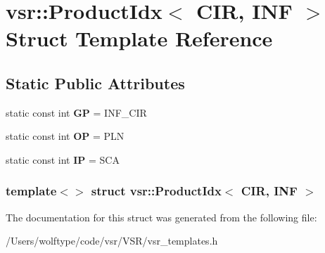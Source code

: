 \hypertarget{structvsr_1_1_product_idx_3_01_c_i_r_00_01_i_n_f_01_4}{\section{vsr\-:\-:Product\-Idx$<$ C\-I\-R, I\-N\-F $>$ Struct Template Reference}
\label{structvsr_1_1_product_idx_3_01_c_i_r_00_01_i_n_f_01_4}
}
\subsection*{Static Public Attributes}
\begin{DoxyCompactItemize}
\item 
\hypertarget{structvsr_1_1_product_idx_3_01_c_i_r_00_01_i_n_f_01_4_a0c552d02ee1c158abe1b4806318537e1}{static const int {\bfseries G\-P} = I\-N\-F\-\_\-\-C\-I\-R}\label{structvsr_1_1_product_idx_3_01_c_i_r_00_01_i_n_f_01_4_a0c552d02ee1c158abe1b4806318537e1}

\item 
\hypertarget{structvsr_1_1_product_idx_3_01_c_i_r_00_01_i_n_f_01_4_a58b3f134d6c4e61e942768716bbcbe9a}{static const int {\bfseries O\-P} = P\-L\-N}\label{structvsr_1_1_product_idx_3_01_c_i_r_00_01_i_n_f_01_4_a58b3f134d6c4e61e942768716bbcbe9a}

\item 
\hypertarget{structvsr_1_1_product_idx_3_01_c_i_r_00_01_i_n_f_01_4_a10b84550d8277f539ce4b25acf69079c}{static const int {\bfseries I\-P} = S\-C\-A}\label{structvsr_1_1_product_idx_3_01_c_i_r_00_01_i_n_f_01_4_a10b84550d8277f539ce4b25acf69079c}

\end{DoxyCompactItemize}
\subsubsection*{template$<$$>$ struct vsr\-::\-Product\-Idx$<$ C\-I\-R, I\-N\-F $>$}



The documentation for this struct was generated from the following file\-:\begin{DoxyCompactItemize}
\item 
/\-Users/wolftype/code/vsr/\-V\-S\-R/vsr\-\_\-templates.\-h\end{DoxyCompactItemize}
